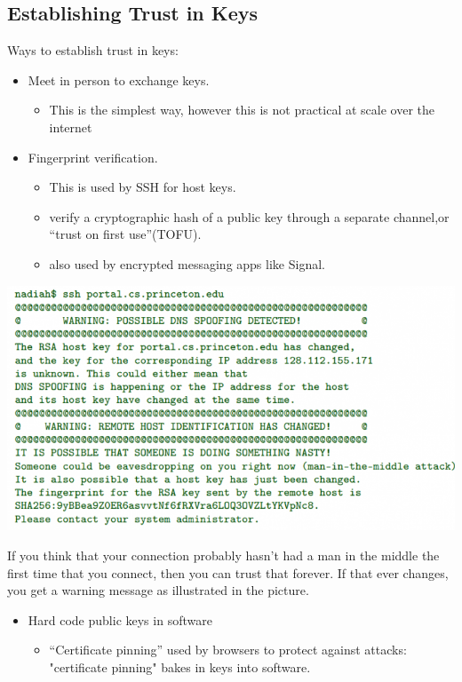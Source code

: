 \documentclass[11pt]{article} %
\begin{document}
\newpage
\subsection{Establishing Trust in Keys}
Ways to establish trust in keys:
\begin{itemize}
  \item Meet in person to exchange keys.
  \begin{itemize}\item This is the simplest way, however this is not practical at scale over the internet
  \end{itemize}
\end{itemize}



\begin{itemize}
  \item Fingerprint verification.
  \begin{itemize}\item This is used by SSH for host keys.  \item verify a cryptographic hash of a public key through a separate channel,or “trust on first use”(TOFU). 


  \item also used by encrypted messaging apps like Signal.


  \end{itemize}
\end{itemize}

\includegraphics[scale=0.65]{./Trust-in-keys1.png}

  If you think that your connection probably hasn't had a man in the middle the first time that you connect, then you can trust that forever. If that ever changes, you get a warning message as illustrated in the picture.

\begin{itemize}
  \item Hard code public keys in software
  \begin{itemize}\item “Certificate pinning” used by browsers to protect against attacks: "certificate pinning" bakes in keys into software.
 
  \end{itemize}
\end{itemize}
\end{document}
